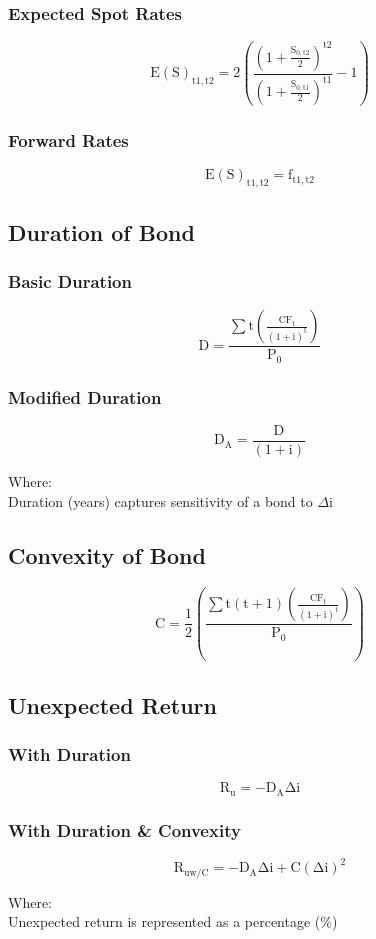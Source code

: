 \documentclass[11pt, english]{article}
\begin{document}
		\subsubsection{Expected Spot Rates}

	$$\mathrm{E(S)_{t1,t2}=2\left(\frac{\left(1+\frac{S_{0,t2}}{2}\right)^{t2}}{\left(1+\frac{S_{0,t1}}{2}\right)^{t1}}-1\right)}$$

		\subsubsection{Forward Rates}
	
	$$\mathrm{E(S)_{t1,t2}=f_{t1,t2}}$$

	\subsection{Duration of Bond}

		\subsubsection{Basic Duration}

	$$\mathrm{D=\frac{\sum t\left(\frac{CF_t}{(1+i)^t}\right)}{P_0}}$$

		\subsubsection{Modified Duration}

	$$\mathrm{D_A=\frac{D}{(1+i)}}$$

	Where:\\
	Duration (years) captures sensitivity of a bond to $\Delta$i

	\subsection{Convexity of Bond}

	$$\mathrm{C=\frac{1}{2}\left(\frac{\sum t(t+1)\left(\frac{CF_t}{(1+i)^t}\right)}{P_0}\right)}$$

	\subsection{Unexpected Return}

		\subsubsection{With Duration}

	$$\mathrm{R_u=-D_A\Delta i}$$

		\subsubsection{With Duration \& Convexity}

	$$\mathrm{R_{uw/C}=-D_A\Delta i+C(\Delta i)^2}$$

	Where:\\
	Unexpected return is represented as a percentage (\%)
\end{document}
